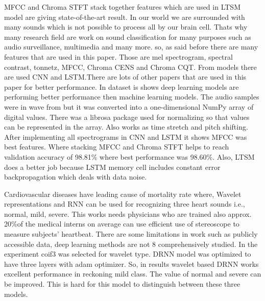 
MFCC and Chroma STFT \parencite{1} stack together features which are used in LTSM model are giving state-of-the-art result. In our world we are surrounded with many sounds which is not possible to process all by our brain cell. Thats why many research field are work on sound classification for many purposes such as audio surveillance, multimedia and many more. so, as said before there are many features that are used in this paper. Those are mel spectrogram, spectral contrast, tonnetz, MFCC, Chroma CENS and Chroma CQT. From models there are used CNN and LSTM.There are lots of other papers that are used in this paper for better performance. In dataset is shows deep learning models are performing better performance then machine learning models. The audio samples were in wave from but it was converted into a one-dimensional NumPy array of digital values. There was a librosa package used for normalizing so that values can be represented in the array. Also works as time stretch and pitch shifting. After implementing all spectrograms in CNN and LSTM it shows MFCC was best features. Where stacking MFCC and Chroma STFT helps to reach validation accuracy of 98.81\% where best performance was 98.60\%. Also, LTSM does a better job because LSTM memory cell includes constant error backpropagation which deals with data noise. 

Cardiovascular diseases have leading cause of mortality rate where, Wavelet representations and RNN \parencite{2} can be used for recognizing three heart sounds i.e., normal, mild, severe. This works needs physicians who are trained also approx. 20\%of the medical interns on average can use efficient use of stereoscope to measure subjects’ heartbeat. There are some limitations in work such as publicly accessible data, deep learning methods are not 8 comprehensively studied. In the experiment coif3 was selected for wavelet type. DRNN model was optimized to have three layers with adam optimizer. So, in results wavelet based DRNN works excellent performance in reckoning mild class. The value of normal and severe can be improved. This is hard for this model to distinguish between these three models. 

